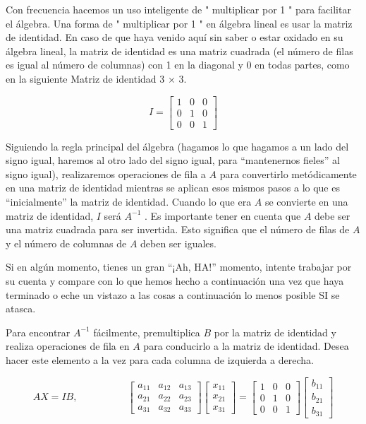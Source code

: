 \documentclass[11pt]{article}
\begin{document}
Con frecuencia hacemos un uso inteligente de " multiplicar por 1 " para facilitar el álgebra. Una forma de " multiplicar por 1 " en álgebra lineal es usar la matriz de identidad. En caso de que haya venido aquí sin saber o estar oxidado en su álgebra lineal, la matriz de identidad es una matriz cuadrada (el número de filas es igual al número de columnas) con 1 en la diagonal y 0 en todas partes, como en la siguiente Matriz de identidad 3 × 3.

\begin{equation}
	I = \begin {bmatrix} 1 & 0 & 0 \\ 0 & 1 & 0 \\ 0 & 0 & 1 \end {bmatrix}
\end{equation}

Siguiendo la regla principal del álgebra (hagamos lo que hagamos a un lado del signo igual, haremos al otro lado del signo igual, para ``mantenernos fieles'' al signo igual), realizaremos operaciones de fila a $A$ para convertirlo metódicamente en una matriz de identidad mientras se aplican esos mismos pasos a lo que es ``inicialmente'' la matriz de identidad. Cuando lo que era $A$ se convierte en una matriz de identidad, $I$ será $A^{- 1}$ . Es importante tener en cuenta que $A$ debe ser una matriz cuadrada para ser invertida. Esto significa que el número de filas de $A$ y el número de columnas de $A$ deben ser iguales.

Si en algún momento, tienes un gran ``¡Ah, HA!'' momento, intente trabajar por su cuenta y compare con lo que hemos hecho a continuación una vez que haya terminado o eche un vistazo a las cosas a continuación lo menos posible SI se atasca.

Para encontrar $A^{- 1}$ fácilmente, premultiplica $B$ por la matriz de identidad y realiza operaciones de fila en $A$ para conducirlo a la matriz de identidad. Desea hacer este elemento a la vez para cada columna de izquierda a derecha.

\begin{equation}
	AX = IB, \hspace {5em} \begin {bmatrix} a_{11} & a_{12} & a_{13} \\ a_{21} & a_{22} & a_{23} \\ a_{31} & a_{32} & a_{33} \end {bmatrix} \begin {bmatrix} x_{11} \\ x_{21} \\ x_{31} \end {bmatrix} = \begin {bmatrix} 1 & 0 & 0 \\ 0 & 1 & 0 \\ 0 & 0 & 1 \end {bmatrix} \begin {bmatrix} b_{11} \\ b_{21} \\ b_{31} \end {bmatrix}
\end{equation}
\end{document}
